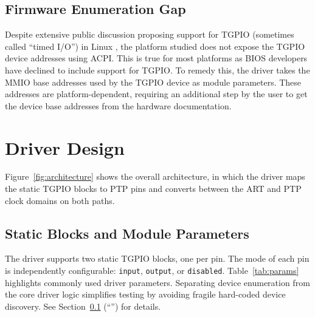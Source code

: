 \documentclass[conference,a4paper]{IEEEtran}
\newcommand{\reffig}[1]{Figure~\ref{#1}\xspace}
\newcommand{\reftab}[1]{Table~\ref{#1}\xspace}
\newcommand{\refsec}[1]{Section~\ref{#1}\xspace}
\begin{document}

\subsection{Firmware Enumeration Gap}\label{sec:device-enumeration}

Despite extensive public discussion proposing support for TGPIO (sometimes called ``timed I/O'') in Linux \cite{linux-pps-gen-tio,lkml-tgpio-pmc,lkml-tgpio-io}, the platform studied does not expose the TGPIO device addresses using ACPI. This is true for most platforms as BIOS developers have declined to include support for TGPIO. To remedy this, the driver takes the MMIO base addresses used by the TGPIO device as module parameters. These addresses are platform-dependent, requiring an additional step by the user to get the device base addresses from the hardware documentation.

\section{Driver Design}\label{sec:driver-design}

\reffig{fig:architecture} shows the overall architecture, in which the driver maps the static TGPIO blocks to PTP pins and converts between the ART and PTP clock domains on both paths.

\subsection{Static Blocks and Module Parameters}

The driver supports two static TGPIO blocks, one per pin. The mode of each pin is independently configurable: \texttt{input}, \texttt{output}, or \texttt{disabled}.
\reftab{tab:params} highlights commonly used driver parameters. Separating device enumeration from the core driver logic simplifies testing by avoiding fragile hard-coded device discovery. See \refsec{sec:device-enumeration} (``'') for details.
\end{document}
